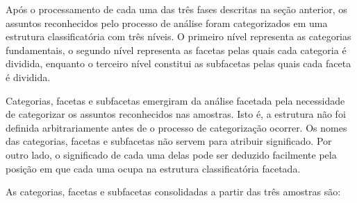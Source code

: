 Após o processamento de cada uma das três fases descritas na seção anterior, os assuntos reconhecidos pelo processo de análise foram categorizados em uma estrutura classificatória com três níveis. O primeiro nível representa as categorias fundamentais, o segundo nível representa as facetas pelas quais cada categoria é dividida, enquanto o terceiro nível constitui as subfacetas pelas quais cada faceta é dividida.

Categorias, facetas e subfacetas emergiram da análise facetada pela necessidade de categorizar os assuntos reconhecidos nas amostras. Isto é, a estrutura não foi definida arbitrariamente antes de o processo de categorização ocorrer. Os nomes das categorias, facetas e subfacetas não servem para atribuir significado. Por outro lado, o significado de cada uma delas pode ser deduzido facilmente pela posição em que cada uma ocupa na estrutura classificatória facetada.

As categorias, facetas e subfacetas consolidadas a partir das três amostras são:









